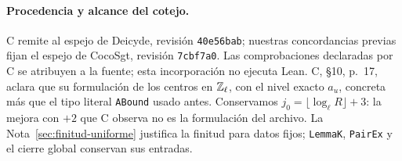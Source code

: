 \paragraph{Procedencia y alcance del cotejo.}
C remite al espejo de Deicyde, revisión \texttt{40e56bab};
nuestras concordancias previas fijan el espejo de CocoSgt,
revisión \texttt{7cbf7a0}.
Las comprobaciones declaradas por C se atribuyen a la fuente;
esta incorporación no ejecuta Lean.
C, §10, p.~17, aclara que su formulación de los centros
en $\mathbb{Z}_\ell$, con el nivel exacto $a_u$, concreta más que el tipo
literal \texttt{ABound} usado antes.
Conservamos $j_0=\lfloor\log_\ell R\rfloor+3$:
la mejora con $+2$ que C observa no es la formulación del archivo.
La Nota~\ref{sec:finitud-uniforme} justifica la finitud para datos fijos;
\texttt{LemmaK}, \texttt{PairEx} y el cierre global conservan sus entradas.
